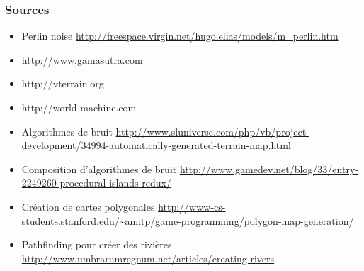 \documentclass[hyperref={pdfpagelabels=false}]{beamer}
\begin{document}


\begin{frame}
  \frametitle{Sources}
  \begin{itemize}
  \item Perlin noise {\tiny \url{http://freespace.virgin.net/hugo.elias/models/m_perlin.htm}}
  \item http://www.gamasutra.com
  \item http://vterrain.org
  \item http://world-machine.com
  \item Algorithmes de bruit {\tiny \url{http://www.sluniverse.com/php/vb/project-development/34994-automatically-generated-terrain-map.html}}
  \item Composition d'algorithmes de bruit {\tiny \url{http://www.gamedev.net/blog/33/entry-2249260-procedural-islands-redux/}}
  \item Création de cartes polygonales {\tiny \url{http://www-cs-students.stanford.edu/~amitp/game-programming/polygon-map-generation/}}
  \item Pathfinding pour créer des rivières {\tiny \url{http://www.umbrarumregnum.net/articles/creating-rivers}}
  \end{itemize}
\end{frame}
\end{document}
